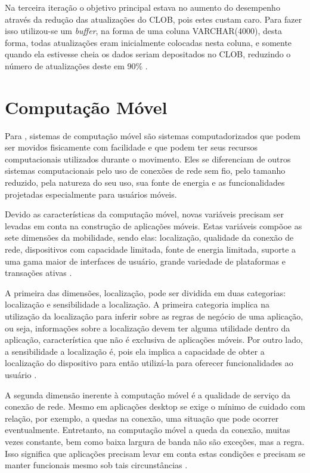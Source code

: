 \documentclass[diss]{template/setrem}
\begin{document}
Na terceira iteração o objetivo principal estava no aumento do desempenho através da redução das atualizações do CLOB, pois estes custam caro. Para fazer isso utilizou-se um \emph{buffer}, na forma de uma coluna VARCHAR(4000), desta forma, todas atualizações eram inicialmente colocadas nesta coluna, e somente quando ela estivesse cheia os dados seriam depositados no CLOB, reduzindo o número de atualizações deste em 90\% \citep{Hurvitz2008}.

\section{Computação Móvel}
\label{sec:computacaomovel}
Para \citet{BFar2004}, sistemas de computação móvel são sistemas computadorizados que podem ser movidos fisicamente com facilidade e que podem ter seus recursos computacionais utilizados durante o movimento. Eles se diferenciam de outros sistemas computacionais pelo uso de conexões de rede sem fio, pelo tamanho reduzido, pela natureza do seu uso, sua fonte de energia e as funcionalidades projetadas especialmente para usuários móveis.

Devido as características da computação móvel, novas variáveis precisam ser levadas em conta na construção de aplicações móveis. Estas variáveis compõoe as sete dimensões da mobilidade, sendo elas: localização, qualidade da conexão de rede, dispositivos com capacidade limitada, fonte de energia limitada, suporte a uma gama maior de interfaces de usuário, grande variedade de plataformas e transações ativas \citep{BFar2004}.

A primeira das dimensões, localização, pode ser dividida em duas categorias: localização e sensibilidade a localização.
A primeira categoria implica na utilização da localização para inferir sobre as regras de negócio de uma aplicação, ou seja, informações sobre a localização devem ter alguma utilidade dentro da aplicação, característica que não é exclusiva de aplicações móveis. Por outro lado, a sensibilidade a localização é, pois ela implica a capacidade de obter a localização do dispositivo para então utilizá-la para oferecer funcionalidades ao usuário \citep{BFar2004}.

A segunda dimensão inerente à computação móvel é a qualidade de serviço da conexão de rede. Mesmo em aplicações desktop se exige o mínimo de cuidado com relação, por exemplo, a quedas na conexão, uma situação que pode ocorrer eventualmente. Entretanto, na computação móvel a queda da conexão, muitas vezes constante, bem como baixa largura de banda não são exceções, mas a regra. Isso significa que aplicações precisam levar em conta estas condições e precisam se manter funcionais mesmo sob tais circunstâncias \citep{BFar2004}.
\end{document}
